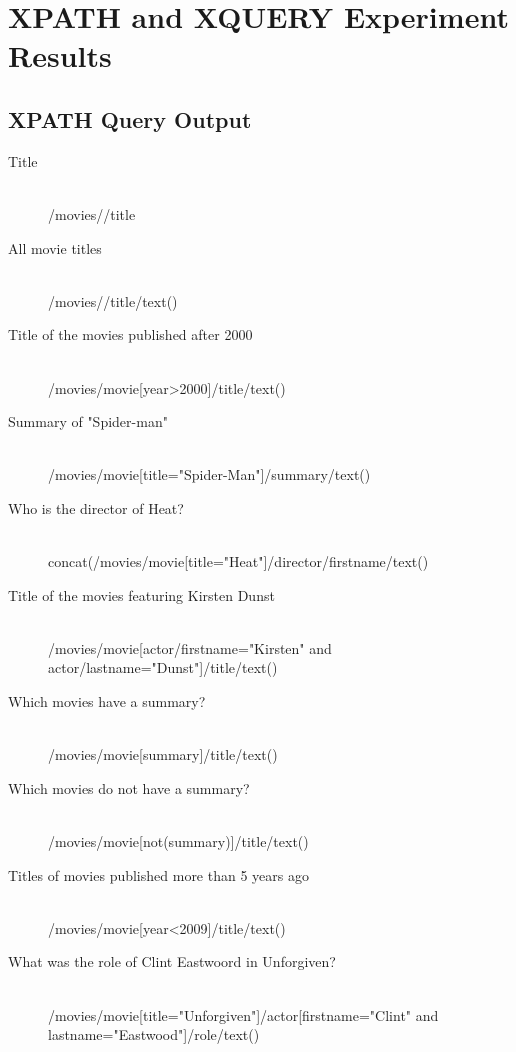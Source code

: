 \documentclass[xPath&xQuery.tex]{subfiles}
\begin{document}
\section{XPATH and XQUERY Experiment Results}

\subsection{XPATH Query Output}

\begin{description}
  \item[Title] \hfill \\
  /movies//title
  
  \item[All movie titles] \hfill \\
  /movies//title/text()
  
  \item[Title of the movies published after 2000] \hfill \\
  /movies/movie[year>2000]/title/text()
  
  \item[Summary of "Spider-man"] \hfill \\
  /movies/movie[title="Spider-Man"]/summary/text()
  
  \item[Who is the director of Heat?] \hfill \\
  concat(/movies/movie[title="Heat"]/director/firstname/text()
  
  \item[Title of the movies featuring Kirsten Dunst] \hfill \\
  /movies/movie[actor/firstname="Kirsten" and actor/lastname="Dunst"]/title/text()
  
  \item[Which movies have a summary?] \hfill \\
  /movies/movie[summary]/title/text()
  
  \item[Which movies do not have a summary?] \hfill \\
  /movies/movie[not(summary)]/title/text()
  
  \item[Titles of movies published more than 5 years ago] \hfill \\
  /movies/movie[year<2009]/title/text()
  
  \item[What was the role of Clint Eastwoord in Unforgiven?] \hfill \\
  /movies/movie[title="Unforgiven"]/actor[firstname="Clint" and lastname="Eastwood"]/role/text()
  

\end{description}
\end{document}
